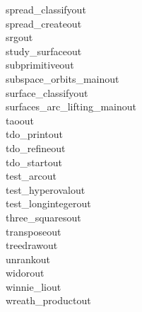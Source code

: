 \begin{tabbing}
spread\_classifyout\\[0pt]
spread\_createout\\[0pt]
srgout\\[0pt]
study\_surfaceout\\[0pt]
subprimitiveout\\[0pt]
subspace\_orbits\_mainout\\[0pt]
surface\_classifyout\\[0pt]
surfaces\_arc\_lifting\_mainout\\[0pt]
taoout\\[0pt]
tdo\_printout\\[0pt]
tdo\_refineout\\[0pt]
tdo\_startout\\[0pt]
test\_arcout\\[0pt]
test\_hyperovalout\\[0pt]
test\_longintegerout\\[0pt]
three\_squaresout\\[0pt]
transposeout\\[0pt]
treedrawout\\[0pt]
unrankout\\[0pt]
widorout\\[0pt]
winnie\_liout\\[0pt]
wreath\_productout\\[0pt]
\end{tabbing}
